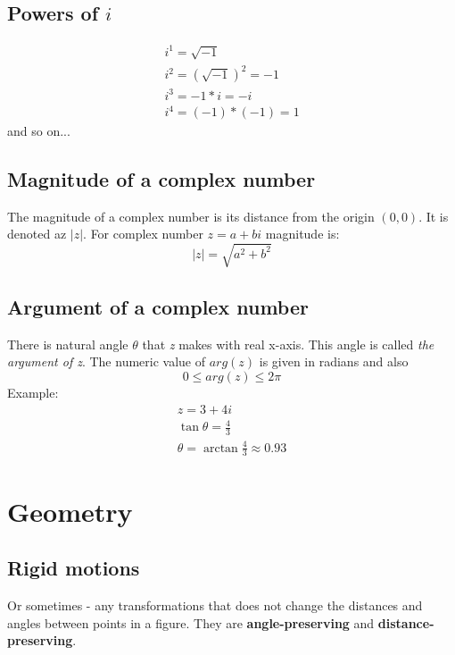 \documentclass{article}
\begin{document}
\subsection{Powers of $i$}
\begin{equation}
  \begin{gathered}
    i^1 = \sqrt{-1} \\
    i^2 = (\sqrt{-1})^2 = -1 \\
    i^3 = -1 * i = -i \\
    i^4 = (-1) * (-1) = 1
  \end{gathered}
\end{equation}
and so on...

\subsection{Magnitude of a complex number}
The magnitude of a complex number is its distance from the origin $(0, 0)$.
It is denoted az $|z|$. For complex number $z = a + bi$ magnitude is:
\begin{equation}
  |z| = \sqrt{a^2 + b^2}
\end{equation}

\subsection{Argument of a complex number}
There is natural angle $\theta$ that \textit{z} makes with real x-axis. This angle is called \textit{the argument of z}. The numeric value of $arg(z)$ is given in radians and also
\begin{equation}
  0 \leq arg(z) \leq 2\pi
\end{equation}
Example:
\begin{equation}
  \begin{gathered}
    z = 3 + 4i \\
    \tan \theta = \frac{4}{3} \\
    \theta = \arctan\frac{4}{3} \approx 0.93
  \end{gathered}
\end{equation}

\section{Geometry}
\subsection{Rigid motions}
Or sometimes - any transformations that does not change the distances
and angles between points in a figure. They are \textbf{angle-preserving} and
\textbf{distance-preserving}.
\end{document}
